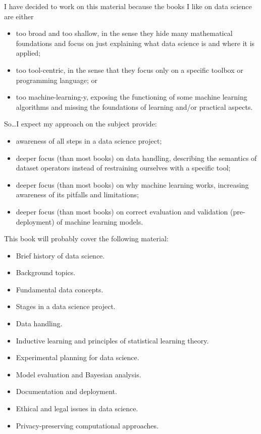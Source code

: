 I have decided to work on this material because the books I like on data science are
either
\begin{itemize}
  \item too broad and too shallow, in the sense they hide many mathematical foundations
    and focus on just explaining what data science is and where it is applied;
  \item too tool-centric, in the sense that they focus only on a specific toolbox or
    programming language; or
  \item too machine-learning-y, exposing the functioning of some machine learning
    algorithms and missing the foundations of learning and/or practical aspects.
\end{itemize}

So\dots I expect my approach on the subject provide:
\begin{itemize}
  \item awareness of all steps in a data science project;
  \item deeper focus (than most books) on data handling, describing the semantics of dataset
    operators instead of restraining ourselves with a specific tool;
  \item deeper focus (than most books) on why machine learning works, increasing awareness of its pitfalls and
    limitations;
  \item deeper focus (than most books) on correct evaluation and validation
    (pre-deployment) of machine learning models.
\end{itemize}

This book will probably cover the following material:
\begin{itemize}
  \item Brief history of data science.
  \item Background topics.
  \item Fundamental data concepts.
  \item Stages in a data science project.
  \item Data handling.
  \item Inductive learning and principles of statistical learning theory.
  \item Experimental planning for data science.
  \item Model evaluation and Bayesian analysis.
  \item Documentation and deployment.
  \item Ethical and legal issues in data science.
  \item Privacy-preserving computational approaches.
\end{itemize}
